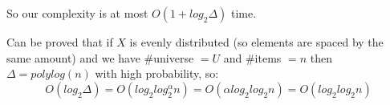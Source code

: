 So our complexity is at most $O(1 + log_2 \Delta)$ time.

Can be proved that if $X$ is evenly distributed (so elements are spaced by the same amount) and we have $\#$universe $ = U$ and $\#$items $ = n$ then $\Delta = polylog(n)$ with high probability, so:
$$
    O(log_2 \Delta) = O(log_2 log_2^\alpha n) = O(\alpha log_2 log_2 n) = O(log_2 log_2 n)
$$


